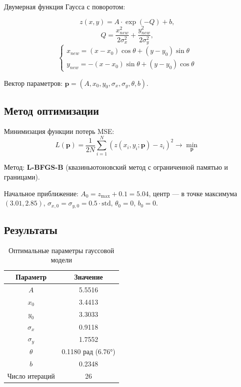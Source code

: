 Двумерная функция Гаусса с поворотом:

\begin{equation}\label{eq:gauss}
    z(x, y) = A \cdot \exp\left(-Q\right) + b,
\end{equation}
\begin{equation}
    Q = \frac{x_{new}^2}{2\sigma_x^2} + \frac{y_{new}^2}{2\sigma_y^2},
\end{equation}
\begin{equation}
    \begin{cases}
        x_{new} = (x - x_0)\cos\theta + (y - y_0)\sin\theta \\
        y_{new} = -(x - x_0)\sin\theta + (y - y_0)\cos\theta
    \end{cases}
\end{equation}

Вектор параметров: $\mathbf{p} = (A, x_0, y_0, \sigma_x, \sigma_y, \theta, b)$.

\subsection{Метод оптимизации}

Минимизация функции потерь MSE:
\begin{equation}
    L(\mathbf{p}) = \frac{1}{2N}\sum_{i=1}^{N}\left(z(x_i, y_i; \mathbf{p}) - z_i\right)^2 \to \min_{\mathbf{p}}
\end{equation}

Метод: \textbf{L-BFGS-B} (квазиньютоновский метод с ограниченной памятью и границами).

Начальное приближение: $A_0 = z_{\max} + 0.1 = 5.04$, центр --- в точке максимума $(3.01, 2.85)$, $\sigma_{x,0} = \sigma_{y,0} = 0.5 \cdot \text{std}$, $\theta_0 = 0$, $b_0 = 0$.

\subsection{Результаты}

\begin{table}[H]
    \centering
    \caption{Оптимальные параметры гауссовой модели}
    \label{tab:gauss_params}
    \begin{tabular}{|c|c|}
        \hline
        \textbf{Параметр} & \textbf{Значение} \\
        \hline
        $A$ & 5.5516 \\
        $x_0$ & 3.4413 \\
        $y_0$ & 3.3033 \\
        $\sigma_x$ & 0.9118 \\
        $\sigma_y$ & 1.7552 \\
        $\theta$ & 0.1180 рад (6.76°) \\
        $b$ & 0.2348 \\
        \hline
        Число итераций & 26 \\
        \hline
    \end{tabular}
\end{table}

